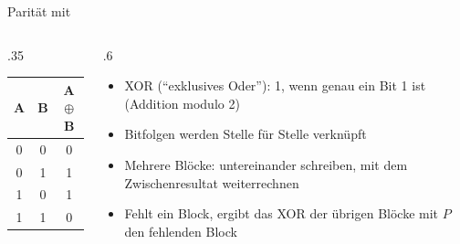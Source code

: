 \begin{frame}{Parität mit }
    \begin{columns}
        \begin{column}{.35\textwidth}
            \begin{center}
                \begin{tabular}{ccc}
                    A & B & A $\oplus$ B \\\midrule
                    0 & 0 & 0            \\
                    0 & 1 & 1            \\
                    1 & 0 & 1            \\
                    1 & 1 & 0            \\
                \end{tabular}
            \end{center}
        \end{column}
        \begin{column}{.6\textwidth}
            \begin{itemize}[<+->]
                \item \acrshort{XOR} (\enquote{exklusives Oder}): 1, wenn genau ein Bit 1 ist (Addition modulo 2)
                \item Bitfolgen werden Stelle für Stelle verknüpft
                \item Mehrere Blöcke: untereinander schreiben, mit dem Zwischenresultat weiterrechnen
                \item Fehlt ein Block, ergibt das \acrshort{XOR} der übrigen Blöcke mit \(P\) den fehlenden Block
            \end{itemize}
        \end{column}
    \end{columns}
\end{frame}


